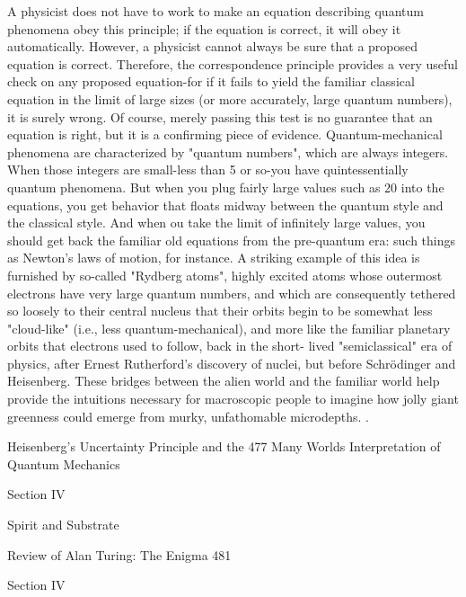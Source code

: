 A physicist does not have to work to make an equation describing quantum
phenomena obey this principle; if the equation is correct, it will obey it automatically.
However, a physicist cannot always be sure that a proposed equation is correct.
Therefore, the correspondence principle provides a very useful check on any proposed
equation-for if it fails to yield the familiar classical equation in the limit of large sizes
(or more accurately, large quantum numbers), it is surely wrong. Of course, merely
passing this test is no guarantee that an equation is right, but it is a confirming piece
of evidence.
        Quantum-mechanical phenomena are characterized by "quantum numbers",
which are always integers. When those integers are small-less than 5 or so-you have
quintessentially quantum phenomena. But when you plug fairly large values such as
20 into the equations, you get behavior that floats midway between the quantum style
and the classical style. And when ou take the limit of infinitely large values, you
should get back the familiar old equations from the pre-quantum era: such things as
Newton's laws of motion, for instance.
        A striking example of this idea is furnished by so-called "Rydberg atoms",
highly excited atoms whose outermost electrons have very large quantum numbers,
and which are consequently tethered so loosely to their central nucleus that their
orbits begin to be somewhat less "cloud-like" (i.e., less quantum-mechanical), and
more like the familiar planetary orbits that electrons used to follow, back in the short-
lived "semiclassical" era of physics, after Ernest Rutherford's discovery of nuclei, but
before Schrödinger and Heisenberg. These bridges between the alien world and the
familiar world help provide the intuitions necessary for macroscopic people to
imagine how jolly giant greenness could emerge from murky, unfathomable
microdepths. .




Heisenberg's Uncertainty Principle and the                                              477
Many Worlds Interpretation of Quantum Mechanics

                                              Section IV

                                    Spirit and Substrate




Review of Alan Turing: The Enigma                    481

                                                                       Section IV

